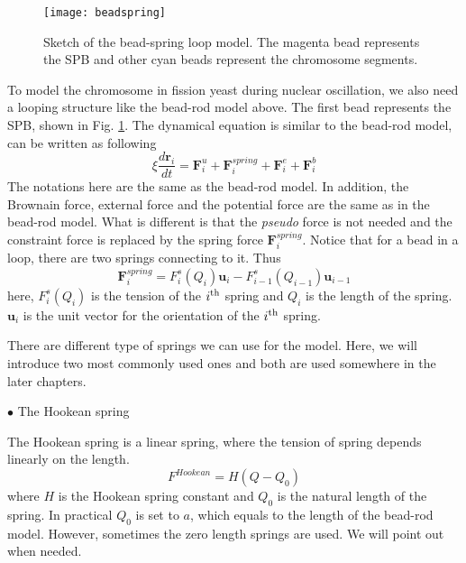 \begin{figure}[htpb]
    \centering
    \texttt{[image: beadspring]}
    \caption{Sketch of the bead-spring loop model. The magenta bead represents the SPB and other cyan beads represent the chromosome segments.}
    \label{fig:beadspring}
\end{figure}

To model the chromosome in fission yeast during nuclear oscillation, we also need a looping structure like the bead-rod model above. The first bead represents the SPB, shown in Fig. \ref{fig:beadspring}. The dynamical equation is similar to the bead-rod model, can be written as following
\begin{equation}
    \label{eq:beadspringEq}
    \xi \frac{d \mathbf{r}_i}{d t} = \mathbf{F}_i^{u} + \mathbf{F}_i^{spring} + \mathbf{F}_i^{e} + \mathbf{F}_i^{b}
\end{equation}
The notations here are the same as the bead-rod model. In addition, the Brownain force, external force and the potential force are the same as in the bead-rod model. What is different is that the \emph{pseudo} force is not needed and the constraint force is replaced by the spring force $\mathbf{F}_i^{spring}$. Notice that for a bead in a loop, there are two springs connecting to it. Thus
\begin{equation}
    \label{eq:springForce}
    \mathbf{F}_i^{spring} = F_i^s(Q_i)\mathbf{u}_i - F_{i-1}^s(Q_{i-1})\mathbf{u}_{i-1}
\end{equation}
here, $F_i^s(Q_i)$ is the tension of the $i^{\rm{th}}$ spring and $Q_i$ is the length of the spring. $\mathbf{u}_i$ is the unit vector for the orientation of the $i^{\rm{th}}$ spring.

There are different type of springs we can use for the model. Here, we will introduce two most commonly used ones and both are used somewhere in the later chapters.

$\bullet$ The Hookean spring

The Hookean spring is a linear spring, where the tension of spring depends linearly on the length. 
\begin{equation}
    \label{eq:hookeanSpring}
    F^{Hookean} = H (Q-Q_0)
\end{equation}
where $H$ is the Hookean spring constant and $Q_0$ is the natural length of the spring. In practical $Q_0$ is set to $a$, which equals to the length of the bead-rod model. However, sometimes the zero length springs are used. We will point out when needed. 

